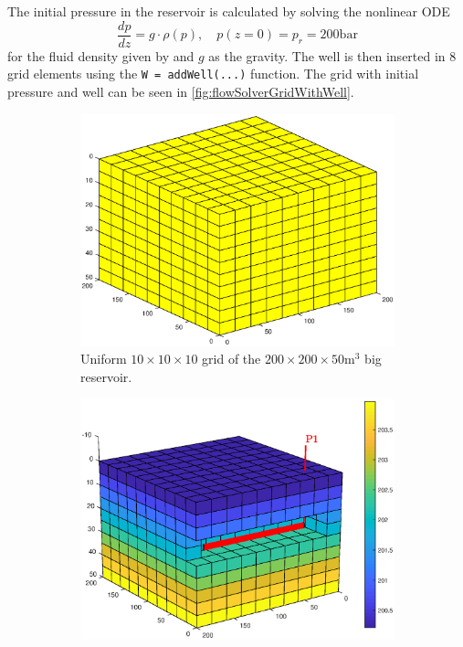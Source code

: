 The initial pressure in the reservoir is calculated by solving the nonlinear ODE
\begin{equation*}
    \frac{dp}{dz} = g\cdot \rho(p), \quad p(z = 0) = p_r = 200\text{bar} 
\end{equation*}  
for the fluid density given by  and $g$ as the gravity. The well is then inserted in 8 grid elements using the \texttt{W = addWell(...)} function. The grid with initial pressure and well can be seen in \autoref{fig:flowSolverGridWithWell}.
\begin{figure}[H]
    \centering
    \begin{subfigure}[t]{0.48\textwidth}
        \centering
        \includegraphics[width = \textwidth]{figures/flowSolver_grid.eps}
        \caption{Uniform $10\times 10 \times 10$ grid of the $200\times 200 \times 50 \text{m}^3$ big reservoir.}
        \label{fig:flowSolverGrid}
    \end{subfigure}
    \hfill
    \begin{subfigure}[t]{0.48\textwidth}
        \centering
        \includegraphics[width = \textwidth]{figures/flowSolver_gridWithWell.eps}

\end{subfigure}
\end{figure}
